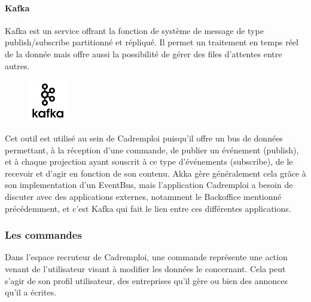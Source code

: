 \paragraph{Kafka}
\label{par:Kafka}
Kafka est un service offrant la fonction de système de message de type publish/subscribe partitionné et répliqué.
Il permet un traitement en temps réel de la donnée mais offre aussi la possibilité de gérer des files d'attentes entre autres.
\begin{figure}
  \begin{center}
    \includegraphics[width=0.15\textwidth]{Pictures/kafka_logo.jpg}
  \end{center}
\end{figure}
Cet outil est utilisé au sein de Cadremploi puisqu'il offre un bus de données permettant, à la réception d'une commande, de publier un événement (publish), et à chaque projection ayant souscrit à ce type d'événements (subscribe), de le recevoir et d'agir en fonction de son contenu.
Akka gère généralement cela grâce à son implementation d'un EventBus, mais l'application Cadremploi a besoin de discuter avec des applications externes, notamment le Backoffice mentionné précédemment, et c'est Kafka qui fait le lien entre ces différentes applications.



\subsubsection{Les commandes}
\label{subs:Les commandes}
Dans l'espace recruteur de Cadremploi, une commande représente une action venant de l'utilisateur visant à modifier les données le concernant.
Cela peut s'agir de son profil utilisateur, des entreprises qu'il gère ou bien des annonces qu'il a écrites.
